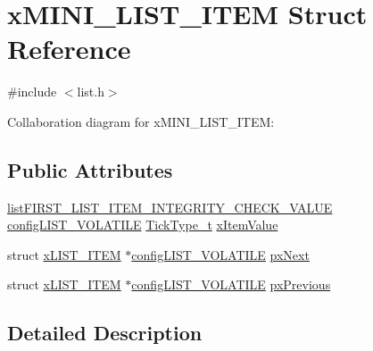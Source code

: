 \hypertarget{structx_m_i_n_i___l_i_s_t___i_t_e_m}{}\section{x\+M\+I\+N\+I\+\_\+\+L\+I\+S\+T\+\_\+\+I\+T\+EM Struct Reference}
\label{structx_m_i_n_i___l_i_s_t___i_t_e_m}


{\ttfamily \#include $<$list.\+h$>$}



Collaboration diagram for x\+M\+I\+N\+I\+\_\+\+L\+I\+S\+T\+\_\+\+I\+T\+EM\+:
\subsection*{Public Attributes}
\begin{DoxyCompactItemize}
\item 
\hyperlink{vendor_2ceedling_2plugins_2freertos_2vendor_2freertos_2include_2list_8h_a3611bd5d5d87cb26ac1dc7a4852b94a0}{list\+F\+I\+R\+S\+T\+\_\+\+L\+I\+S\+T\+\_\+\+I\+T\+E\+M\+\_\+\+I\+N\+T\+E\+G\+R\+I\+T\+Y\+\_\+\+C\+H\+E\+C\+K\+\_\+\+V\+A\+L\+UE} \hyperlink{vendor_2ceedling_2plugins_2freertos_2vendor_2freertos_2include_2list_8h_a2d5de557c5561c8980d1bf51d87d8cba}{config\+L\+I\+S\+T\+\_\+\+V\+O\+L\+A\+T\+I\+LE} \hyperlink{externals_2freertos_2portable_2_g_c_c_2_a_r_m___c_m0_2portmacro_8h_aa69c48c6e902ce54f70886e6573c92a9}{Tick\+Type\+\_\+t} \hyperlink{structx_m_i_n_i___l_i_s_t___i_t_e_m_aae79c54ac1efa30959e68604cc23b29e}{x\+Item\+Value}
\item 
struct \hyperlink{structx_l_i_s_t___i_t_e_m}{x\+L\+I\+S\+T\+\_\+\+I\+T\+EM} $\ast$\hyperlink{vendor_2ceedling_2plugins_2freertos_2vendor_2freertos_2include_2list_8h_a2d5de557c5561c8980d1bf51d87d8cba}{config\+L\+I\+S\+T\+\_\+\+V\+O\+L\+A\+T\+I\+LE} \hyperlink{structx_m_i_n_i___l_i_s_t___i_t_e_m_aa72fe4dc8dbfc53931f10ea54e6eaa5d}{px\+Next}
\item 
struct \hyperlink{structx_l_i_s_t___i_t_e_m}{x\+L\+I\+S\+T\+\_\+\+I\+T\+EM} $\ast$\hyperlink{vendor_2ceedling_2plugins_2freertos_2vendor_2freertos_2include_2list_8h_a2d5de557c5561c8980d1bf51d87d8cba}{config\+L\+I\+S\+T\+\_\+\+V\+O\+L\+A\+T\+I\+LE} \hyperlink{structx_m_i_n_i___l_i_s_t___i_t_e_m_aebf56b558e5970205c2f477154083a57}{px\+Previous}
\end{DoxyCompactItemize}


\subsection{Detailed Description}


